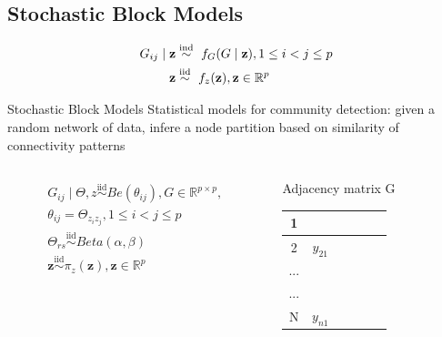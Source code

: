 
 



\subsection{Stochastic Block Models}

\begin{align*}
    G_{ij} \mid \mathbf{z} &\ind\  f_{G}(G \mid \mathbf{z}) , 1 \le i < j \le p \\ %
    \mathbf{z} &\iid\ f_{z}(\mathbf{z}), \mathbf{z} \in \mathbb{R}^p
\end{align*}


\begin{frame}{Stochastic Block Models}
    Statistical models for \alert{community detection}: given a random network of data, infere a node partition based on similarity of connectivity patterns\\

    \begin{columns}
        \begin{column}{0.30\textwidth}
            \begin{align*}
                G_{ij} \mid \Theta,z \overset{\mathrm{iid}}{\sim} Be(\theta_{ij}),  G \in \mathbb{R}^{p \times p}, \\
                \theta_{ij} = \Theta_{z_{i}z_{j}}, 1 \le i < j \le p \\ 
                \Theta_{rs} \overset{\mathrm{iid}}{\sim} Beta(\alpha, \beta)\\
                \mathbf{z} \overset{\mathrm{iid}}{\sim} \pi_{z}(\mathbf{z}), \mathbf{z} \in \mathbb{R}^p
            \end{align*}
            \end{column}
        \begin{column}{0.30\textwidth}
            \alert{Adjacency matrix G}
            \begin{table}[htpb]
            \centering
            \begin{tabular}{c|c|c|c|c|c|} 
            \hline
            1   & &    &    &   &     \\ 
            \hline
            2  &  $y_{21}$ &    &    &   &     \\ 
            \hline
            ...  &   &    &    &   &     \\ 
            \hline
            ...  &   &    &    &   &     \\ 
            \hline
            N  & $y_{n1}$   &    &    &   &  
            \end{tabular}
            \end{table}
        \end{column}



\end{columns}
\end{frame}
